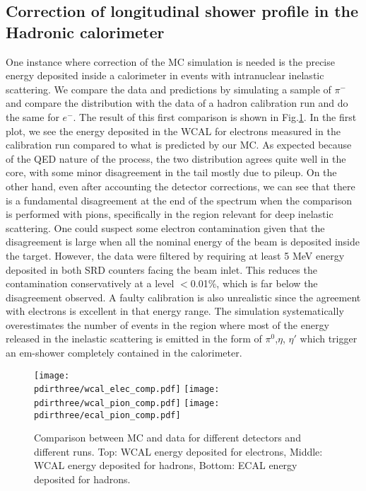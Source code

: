 \subsection{Correction of longitudinal shower profile in the Hadronic calorimeter}
\label{ch3:sec:geant4-hcal-corr}

One instance where correction of the MC simulation is needed is the precise energy deposited inside a calorimeter in events with intranuclear inelastic scattering. We compare the data and predictions by simulating a sample of $\pi^-$ and compare the distribution with the data of a hadron calibration run and do the same for $e^-$. The result of this first comparison is shown in Fig.\ref{fig:ecal-comp}. In the first plot, we see the energy deposited in the WCAL for electrons measured in the calibration run compared to what is predicted by our MC. As expected because of the QED nature of the process, the two distribution agrees quite well in the core, with some minor disagreement in the tail mostly due to pileup. On the other hand, even after accounting the detector corrections, we can see that there is a fundamental disagreement at the end of the spectrum when the comparison is performed with pions, specifically in the region relevant for deep inelastic scattering. One could suspect some electron contamination given that the disagreement is large when all the nominal energy of the beam is deposited inside the target. However, the data were filtered by requiring at least 5 MeV energy deposited in both SRD counters facing the beam inlet. This reduces the contamination conservatively at a level $<$0.01\%, which is far below the disagreement observed. A faulty calibration is also unrealistic since the agreement with electrons is excellent in that energy range. The simulation systematically overestimates the number of events in the region where most of the energy released in the inelastic scattering is emitted in the form of $\pi^0$,$\eta$, $\eta'$ which trigger an em-shower completely contained in the calorimeter.

\begin{figure}[bth!]
  \centering
  \texttt{[image: \\pdirthree/wcal\_elec\_comp.pdf]}
  \texttt{[image: \\pdirthree/wcal\_pion\_comp.pdf]}
  \texttt{[image: \\pdirthree/ecal\_pion\_comp.pdf]}
  \caption[MC/DATA Comparison of $\pi^-$ in ECAL and WCAL]{Comparison between MC and data for different detectors and different runs. Top: WCAL energy deposited for electrons, Middle: WCAL energy deposited for hadrons, Bottom: ECAL energy deposited for hadrons.}
  \label{fig:ecal-comp}
\end{figure}

